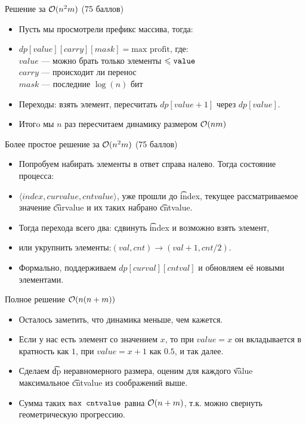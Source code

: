 \begin{frame}{Решение за $\mathcal{O}(n^2m)$ (75 баллов)}
  \begin{itemize}
  \item Пусть мы просмотрели префикс массива, тогда:
  \item $dp[value][carry][mask] = \text{max profit}$, где:\\
  \indent $value$ --- можно брать только элементы $\leqslant \texttt{value}$ \\
  \indent $carry$ --- происходит ли перенос \\
  \indent $mask$ --- последние $\log(n)$ бит \\
  \item Переходы: взять элемент, пересчитать $dp[value + 1]$ через $dp[value]$.
  \item Итогo мы $n$ раз пересчитаем динамику размером $\mathcal{O}(nm)$
  \end{itemize}
\end{frame}

\begin{frame}{Более простое решение за $\mathcal{O}(n^2m)$ (75 баллов)}
  \begin{itemize}
  \item Попробуем набирать элементы в ответ справа налево. Тогда состояние процесса:
  \item $\langle index, curvalue, cntvalue \rangle$, уже прошли до \t{index},
    текущее рассматриваемое значение \t{curvalue} и их таких набрано \t{cntvalue}.
  \item Тогда перехода всего два: сдвинуть \t{index} и возможно взять элемент,
  \item или укрупнить элементы:$(val,cnt) \to (val + 1,cnt / 2)$.
  \item Формально, поддерживаем $dp[curval][cntval]$ и обновляем её новыми элементами.
  \end{itemize}
\end{frame}

\begin{frame}{Полное решение $\mathcal{O}(n(n + m))$}
  \begin{itemize}
  \item Осталось заметить, что динамика меньше, чем кажется.
  \item Если у нас есть элемент со значением $x$, то при $value=x$ он вкладывается в
    кратность как $1$, при $value = x+1$ как $0.5$, и так далее.
  \item Сделаем \t{dp} неравномерного размера, оценим для каждого \t{value} максимальное \t{cntvalue} из соображений выше.
  \item Сумма таких $\texttt{max cntvalue}$ равна $\mathcal{O}(n + m)$, т.к. можно свернуть геометрическую прогрессию.
  \end{itemize}
\end{frame}
